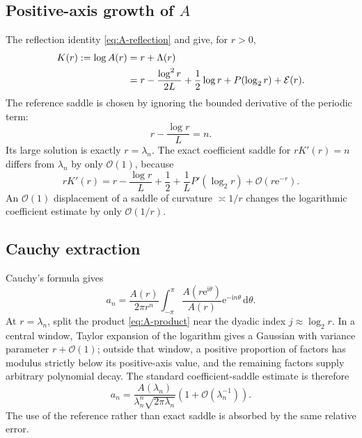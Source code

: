 \documentclass[11pt,oneside]{article}
\theoremstyle{definition}
\theoremstyle{remark}
\newcommand{\e}{\mathrm e}
\newcommand{\ii}{\mathrm i}
\newcommand{\dd}{\,\mathrm d}
\newcommand{\bigO}{\mathcal O}
\newcommand{\Lam}{\Lambda}
\begin{document}
\subsection{Positive-axis growth of \texorpdfstring{$A$}{A}}

The reflection identity \eqref{eq:A-reflection} and
 give, for $r>0$,
\begin{align}
 K(r):=\log A(r)
 ={}&r+\Lam(r)                                               \notag\\
 ={}&r-\frac{\log^2r}{2L}+\frac12\log r
 +P(\log_2r)+\mathcal E(r).                                \label{eq:K-positive}
\end{align}
The reference saddle is chosen by ignoring the bounded derivative of the periodic term:
\begin{equation}
 r-\frac{\log r}{L}=n.                                      \label{eq:reference-saddle}
\end{equation}
Its large solution is exactly $r=\lambda_n$.  The exact coefficient saddle for
$rK'(r)=n$ differs from $\lambda_n$ by only $\bigO(1)$, because
\begin{equation}
 rK'(r)=r-\frac{\log r}{L}+\frac12+\frac1L P'(\log_2r)
 +\bigO(r\e^{-r}).                                          \label{eq:exact-saddle-shift}
\end{equation}
An $\bigO(1)$ displacement of a saddle of curvature $\asymp1/r$ changes the logarithmic
coefficient estimate by only $\bigO(1/r)$.

\subsection{Cauchy extraction}

Cauchy's formula gives
\begin{equation}
 a_n=\frac{A(r)}{2\pi r^n}
 \int_{-\pi}^{\pi}
 \frac{A(r\e^{\ii\theta})}{A(r)}\e^{-\ii n\theta}\dd\theta.
                                                                    \label{eq:Cauchy-an}
\end{equation}
At $r=\lambda_n$, split the product \eqref{eq:A-product} near the dyadic index
$j\approx\log_2r$.  In a central window, Taylor expansion of the logarithm gives a Gaussian
with variance parameter $r+\bigO(1)$; outside that window, a positive proportion of factors
has modulus strictly below its positive-axis value, and the remaining factors supply
arbitrary polynomial decay.  The standard coefficient-saddle estimate \cite{hayman1956,flajolet2009} is therefore
\begin{equation}
 a_n=\frac{A(\lambda_n)}{\lambda_n^n\sqrt{2\pi\lambda_n}}
 \left(1+\bigO(\lambda_n^{-1})\right).                     \label{eq:an-saddle}
\end{equation}
The use of the reference rather than exact saddle is absorbed by the same relative error.
\end{document}
